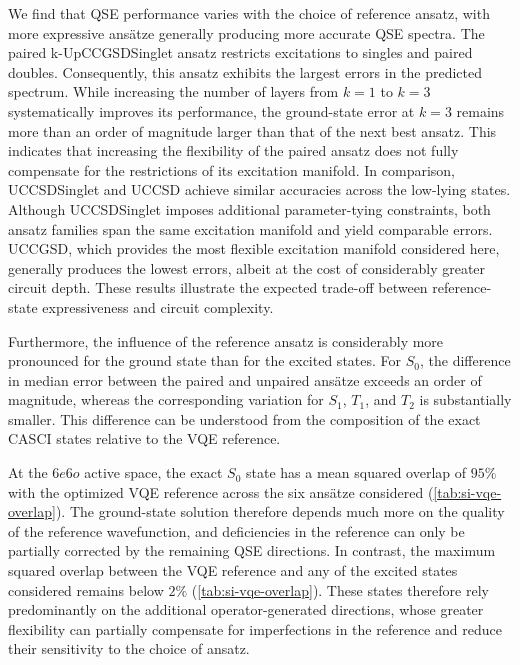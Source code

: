 We find that QSE performance varies with the choice of reference ansatz, with more expressive ansätze generally producing more accurate QSE spectra. 
The paired k-UpCCGSDSinglet ansatz restricts excitations to singles and paired doubles. 
Consequently, this ansatz exhibits the largest errors in the predicted spectrum. 
While increasing the number of layers from $k=1$ to $k=3$ systematically improves its performance, the ground-state error at $k=3$ remains more than an order of magnitude larger than that of the next best ansatz. 
This indicates that increasing the flexibility of the paired ansatz does not fully compensate for the restrictions of its excitation manifold.
In comparison, UCCSDSinglet and UCCSD achieve similar accuracies across the low-lying states. 
Although UCCSDSinglet imposes additional parameter-tying constraints, both ansatz families span the same excitation manifold and yield comparable errors.
UCCGSD, which provides the most flexible excitation manifold considered here, generally produces the lowest errors, albeit at the cost of considerably greater circuit depth. 
These results illustrate the expected trade-off between reference-state expressiveness and circuit complexity.

Furthermore, the influence of the reference ansatz is considerably more pronounced for the ground state than for the excited states. 
For $S_0$, the difference in median error between the paired and unpaired ansätze exceeds an order of magnitude, whereas the corresponding variation for $S_1$, $T_1$, and $T_2$ is substantially smaller. 
This difference can be understood from the composition of the exact CASCI states relative to the VQE reference. 

At the $6e6o$ active space, the exact $S_0$ state has a mean squared overlap of $95\%$ with the optimized VQE reference across the six ansätze considered (\cref{tab:si-vqe-overlap}). 
The ground-state solution therefore depends much more on the quality of the reference wavefunction, and deficiencies in the reference can only be partially corrected by the remaining QSE directions.
In contrast, the maximum squared overlap between the VQE reference and any of the excited states considered remains below $2\%$ (\cref{tab:si-vqe-overlap}).
These states therefore rely predominantly on the additional operator-generated directions, whose greater flexibility can partially compensate for imperfections in the reference and reduce their sensitivity to the choice of ansatz.

